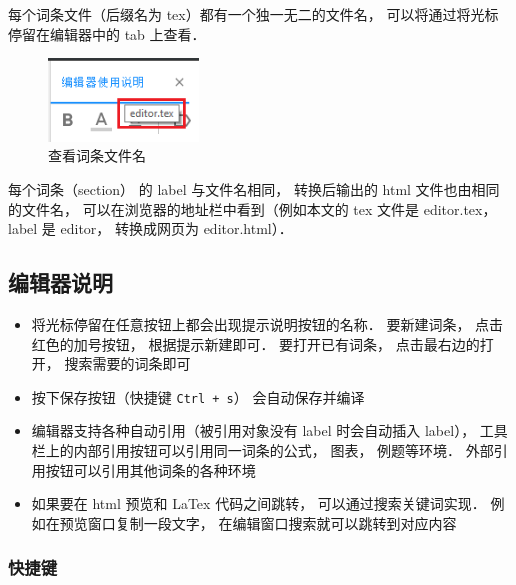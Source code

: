 每个词条文件（后缀名为 tex）都有一个独一无二的文件名， 可以将通过将光标停留在编辑器中的 tab 上查看．

\begin{figure}[ht]
\centering
\includegraphics[width=4cm]{./figures/editor2.png}
\caption{查看词条文件名} \label{editor_fig2}
\end{figure}

每个词条（section） 的 label 与文件名相同， 转换后输出的 html 文件也由相同的文件名， 可以在浏览器的地址栏中看到（例如本文的 tex 文件是 editor.tex， label 是 editor， 转换成网页为 editor.html）．

\subsection{编辑器说明}
\begin{itemize}
\item 将光标停留在任意按钮上都会出现提示说明按钮的名称． 要新建词条， 点击红色的加号按钮， 根据提示新建即可． 要打开已有词条， 点击最右边的打开， 搜索需要的词条即可

\item 按下保存按钮（快捷键 \lstinline|Ctrl + s|） 会自动保存并编译

\item 编辑器支持各种自动引用（被引用对象没有 label 时会自动插入 label）， 工具栏上的内部引用按钮可以引用同一词条的公式， 图表， 例题等环境． 外部引用按钮可以引用其他词条的各种环境

\item 如果要在 html 预览和 LaTex 代码之间跳转， 可以通过搜索关键词实现． 例如在预览窗口复制一段文字， 在编辑窗口搜索就可以跳转到对应内容
\end{itemize}

\subsubsection{快捷键}

